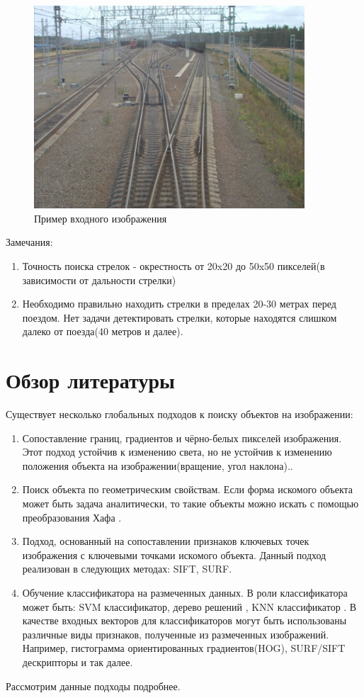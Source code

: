 \begin{figure}[!h]
	\centering
	\includegraphics[width=0.9\textwidth]{pictures/img0002.jpg} 
	\caption{Пример входного изображения}
	\label{fig:input}
\end{figure}

\newpage
Замечания: 
\begin{enumerate}
	\item Точность поиска стрелок - окрестность от 20x20 до 50x50 пикселей(в зависимости от дальности стрелки)
	\item Необходимо правильно находить стрелки в пределах 20-30 метрах перед поездом. Нет задачи детектировать стрелки, которые находятся слишком далеко от поезда(40 метров и далее).
\end{enumerate}

\section{Обзор литературы}
Существует несколько глобальных подходов к поиску объектов на изображении:
\begin{enumerate}
	\item Сопоставление границ, градиентов и чёрно-белых пикселей изображения. Этот подход устойчив к изменению света, но не устойчив к изменению положения объекта на изображении(вращение, угол наклона).\cite{b:edge_match}.
	\item Поиск объекта по геометрическим свойствам. Если форма искомого объекта может быть задача аналитически, то такие объекты можно искать с помощью преобразования Хафа \cite{b:hough_transform}.
	\item Подход, основанный на сопоставлении признаков ключевых точек изображения с ключевыми точками искомого объекта. Данный подход реализован в следующих методах: SIFT\cite{b:SIFT}, SURF\cite{b:SURF}.
	\item Обучение классификатора на размеченных данных. В роли классификатора может быть: SVM классификатор\cite{b:SVM}, дерево решений \cite{b:decision_tree}, KNN классификатор \cite{b:knn}. В качестве входных векторов для классификаторов могут быть использованы различные виды признаков, полученные из размеченных изображений. 
	Например, гистограмма ориентированных градиентов(HOG)\cite{b:HOG},
	SURF\cite{b:SIFT}/SIFT\cite{b:SURF} дескрипторы и так далее. 
	
\end{enumerate}
Рассмотрим данные подходы подробнее.
